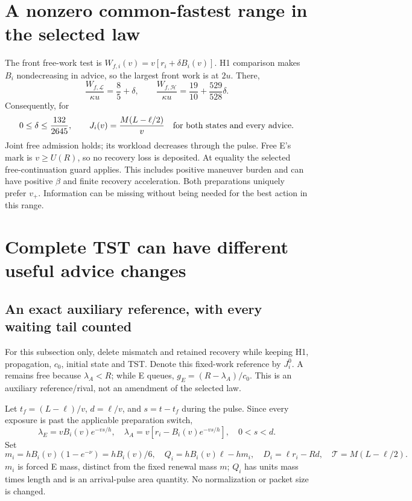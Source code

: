 \documentclass[11pt,a4paper]{article}
\begin{document}
\section{A nonzero common-fastest range in the selected law}
The front free-work test is $W_{f,i}(v)=v[r_i+\delta B_i(v)]$.
H1 comparison makes $B_i$ nondecreasing in advice, so the largest front work
is at $2u$. There,
\begin{equation}
 \frac{W_{f,\mathcal L}}{\kappa u}=\frac85+\delta,\qquad
 \frac{W_{f,\mathcal H}}{\kappa u}=\frac{19}{10}+\frac{529}{528}\delta.
 \label{eq:frontwork}
\end{equation}
Consequently, for
\begin{equation}
 0\leq\delta\leq\frac{132}{2645},\qquad
 J_i(v)=\frac{M(L-\ell/2)}v\quad\hbox{for both states and every advice}.
 \label{eq:negative}
\end{equation}
Joint free admission holds; its workload decreases through the pulse.
Free E's mark is $v\geq U(R)$, so no recovery loss is deposited.
At equality the selected free-continuation guard applies. This includes
positive maneuver burden and can have positive $\beta$ and finite recovery
acceleration. Both preparations uniquely prefer $v_+$. Information can be
missing without being needed for the best action in this range.

\section{Complete TST can have different useful advice changes}
\subsection{An exact auxiliary reference, with every waiting tail counted}
For this subsection only, delete mismatch and retained recovery while
keeping H1, propagation, $c_0$, initial state and TST. Denote this fixed-work
reference by $J_i^0$. A remains free because $\lambda_A< R$; while E queues,
$g_E=(R-\lambda_A)/c_0$. This is an auxiliary reference/rival, not an
amendment of the selected law.

Let $t_f=(L-\ell)/v$, $d=\ell/v$, and $s=t-t_f$ during the pulse.
Since every exposure is past the applicable preparation switch,
\begin{equation}
 \lambda_E=vB_i(v)e^{-vs/h},\quad
 \lambda_A=v[r_i-B_i(v)e^{-vs/h}],\quad 0<s<d.
 \label{eq:arrivalsreference}
\end{equation}
Set
\begin{equation}
 m_i=hB_i(v)(1-e^{-\nu})=hB_i(v)/6,\quad
 Q_i=hB_i(v)\ell-hm_i,\quad D_i=\ell r_i-Rd,\quad
 \mathcal T=M(L-\ell/2).
 \label{eq:referencequantities}
\end{equation}
$m_i$ is forced E mass, distinct from the fixed renewal mass $m$;
$Q_i$ has units mass times length and is an arrival-pulse area quantity.
No normalization or packet size is changed.
\end{document}
